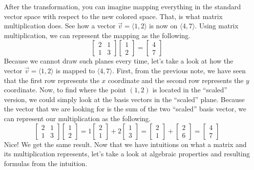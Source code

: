 \documentclass[../main.tex]{subfiles}
\begin{document}
After the transformation, you can imagine mapping everything
in the standard vector space with respect to the new colored
space. That, is what matrix multiplication does. See how
a vector $\vec{v} = \langle 1, 2 \rangle$ is now on
$\langle 4, 7 \rangle$. Using matrix multiplication, we can
represent the mapping as the following.
\[
\begin{bmatrix}
    2 & 1 \\
    1 & 3
\end{bmatrix}
\begin{bmatrix}
    1 \\
    2
\end{bmatrix}
=
\begin{bmatrix}
    4 \\
    7
\end{bmatrix}
\]
Because we cannot draw such planes every time, let's take a look
at how the vector $\vec{v} = \langle 1, 2 \rangle$ is mapped to
$\langle 4, 7 \rangle$. First, from the previous note, we have seen
that the first row represents the $x$ coordinate and the second
row represents the $y$ coordinate. Now, to find where the point
$(1, 2)$ is located in the ``scaled'' version, we could simply look
at the basis vectors in the ``scaled'' plane. Because the vector
that we are looking for is the sum of the two ``scaled'' basis
vector, we can represent our multiplication as the following.
\[
\begin{bmatrix}
    2 & 1 \\
    1 & 3
\end{bmatrix}
\begin{bmatrix}
    1 \\
    2
\end{bmatrix}
=
1
\begin{bmatrix}
    2 \\
    1
\end{bmatrix}
+
2
\begin{bmatrix}
    1 \\
    3
\end{bmatrix}
=
\begin{bmatrix}
    2 \\
    1
\end{bmatrix}
+
\begin{bmatrix}
    2 \\
    6
\end{bmatrix}
=
\begin{bmatrix}
    4 \\
    7
\end{bmatrix}
\]
Nice! We get the same result. Now that we have intuitions on what
a matrix and its multiplication represents, let's take a look at
algebraic properties and resulting formulas from the intuition.
\end{document}
